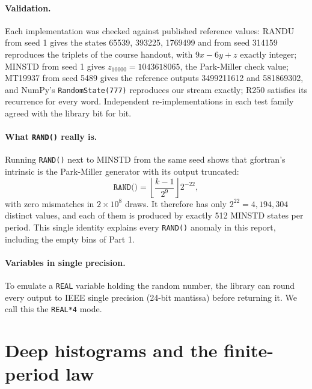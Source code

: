 \documentclass[11pt]{article}
\begin{document}
\paragraph{Validation.} Each implementation was checked against published reference values: RANDU from seed 1 gives the states 65539, 393225, 1769499 and from seed 314159 reproduces the triplets of the course handout, with $9x-6y+z$ exactly integer; MINSTD from seed 1 gives $z_{10000} = 1043618065$, the Park-Miller check value; MT19937 from seed 5489 gives the reference outputs 3499211612 and 581869302, and NumPy's \texttt{RandomState(777)} reproduces our stream exactly; R250 satisfies its recurrence for every word. Independent re-implementations in each test family agreed with the library bit for bit.

\paragraph{What \texttt{RAND()} really is.} Running \texttt{RAND()} next to MINSTD from the same seed shows that gfortran's intrinsic is the Park-Miller generator with its output truncated:
\begin{equation}
\texttt{RAND()} = \left\lfloor \frac{k-1}{2^9} \right\rfloor 2^{-22},
\end{equation}
with zero mismatches in $2\times 10^8$ draws. It therefore has only $2^{22} = 4{,}194{,}304$ distinct values, and each of them is produced by exactly 512 MINSTD states per period. This single identity explains every \texttt{RAND()} anomaly in this report, including the empty bins of Part 1.

\paragraph{Variables in single precision.} To emulate a \texttt{REAL} variable holding the random number, the library can round every output to IEEE single precision (24-bit mantissa) before returning it. We call this the \texttt{REAL*4} mode.

\section{Deep histograms and the finite-period law}
\end{document}
